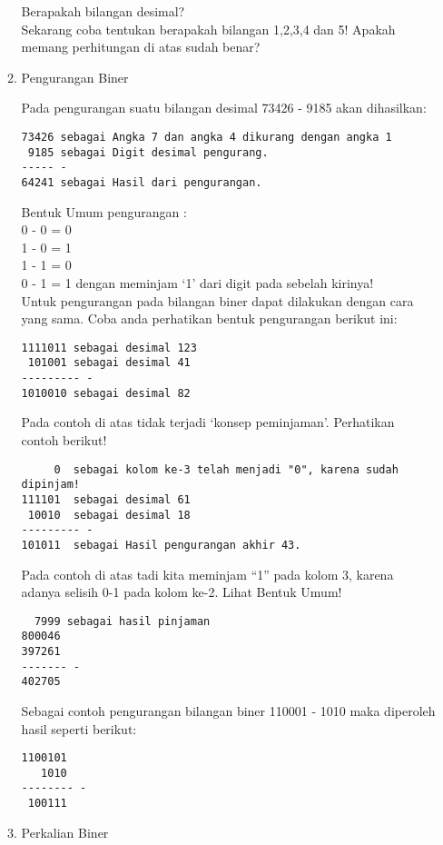 \begin{enumerate}[label=(\alph*)]
\begin{enumerate}
Berapakah bilangan desimal? \\

Sekarang coba tentukan berapakah bilangan 1,2,3,4 dan 5! Apakah memang perhitungan di atas sudah benar? \\

\item Pengurangan Biner

\qquad Pada pengurangan suatu bilangan desimal 73426 - 9185 akan dihasilkan:
\begin{verbatim}
73426 sebagai Angka 7 dan angka 4 dikurang dengan angka 1
 9185 sebagai Digit desimal pengurang.
----- -
64241 sebagai Hasil dari pengurangan.
\end{verbatim}

Bentuk Umum pengurangan : \\
0 - 0 = 0 \\
1 - 0 = 1 \\
1 - 1 = 0 \\
0 - 1 = 1  dengan meminjam `1' dari digit pada sebelah kirinya! \\

\quad Untuk pengurangan pada bilangan biner dapat dilakukan dengan cara yang sama. Coba anda perhatikan bentuk pengurangan berikut ini:
\begin{verbatim}
1111011 sebagai desimal 123
 101001 sebagai desimal 41
--------- -
1010010 sebagai desimal 82
\end{verbatim}
\qquad Pada contoh di atas tidak terjadi `konsep peminjaman'. Perhatikan contoh berikut!

\begin{verbatim}
     0  sebagai kolom ke-3 telah menjadi "0", karena sudah dipinjam!
111101  sebagai desimal 61
 10010  sebagai desimal 18
--------- -
101011  sebagai Hasil pengurangan akhir 43.
\end{verbatim}

\qquad Pada contoh di atas tadi kita meminjam “1” pada kolom 3, karena adanya selisih 0-1 pada kolom ke-2. Lihat Bentuk Umum!
\begin{verbatim}
  7999 sebagai hasil pinjaman
800046
397261
------- -
402705
\end{verbatim}

\qquad Sebagai contoh pengurangan bilangan biner 110001 - 1010 maka diperoleh hasil seperti berikut:
\begin{verbatim}
1100101
   1010
-------- -
 100111
\end{verbatim}

\item Perkalian Biner


\end{enumerate}
\end{enumerate}
